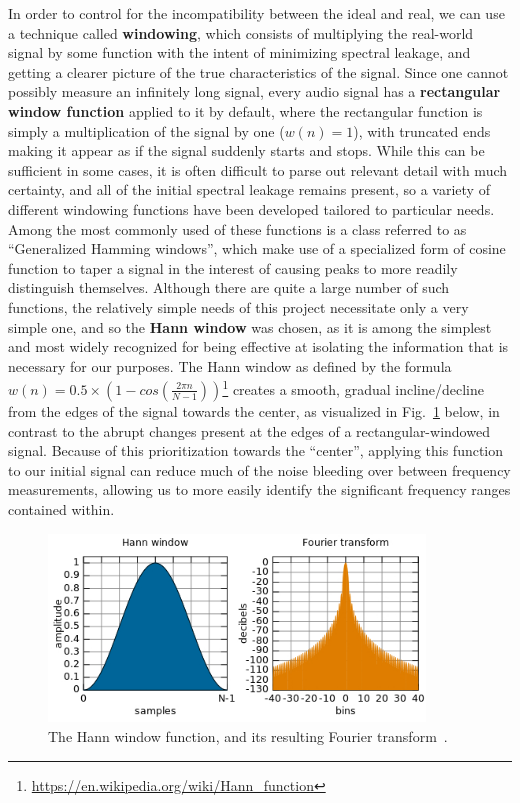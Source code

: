 \documentclass[12pt]{report}
\begin{document}
\indent In order to control for the incompatibility between the ideal and real, we can use a technique called {\bf windowing}, which consists of multiplying the real-world signal by some function with the intent of minimizing spectral leakage, and getting a clearer picture of the true characteristics of the signal. Since one cannot possibly measure an infinitely long signal, every audio signal has a {\bf rectangular window function} applied to it by default, where the rectangular function is simply a multiplication of the signal by one ($w(n) = 1$), with truncated ends making it appear as if the signal suddenly starts and stops. While this can be sufficient in some cases, it is often difficult to parse out relevant detail with much certainty, and all of the initial spectral leakage remains present, so a variety of different windowing functions have been developed tailored to particular needs. Among the most commonly used of these functions is a class referred to as ``Generalized Hamming windows'', which make use of a specialized form of cosine function to taper a signal in the interest of causing peaks to more readily distinguish themselves. Although there are quite a large number of such functions, the relatively simple needs of this project necessitate only a very simple one, and so the {\bf Hann window} was chosen, as it is among the simplest and most widely recognized for being effective at isolating the information that is necessary for our purposes. The Hann window as defined by the formula $w(n) = 0.5 \times (1 - cos(\frac{2 \pi n}{N - 1}))$\footnote{\url{https://en.wikipedia.org/wiki/Hann_function}} creates a smooth, gradual incline/decline from the edges of the signal towards the center, as visualized in Fig.~\ref{fig:hann} below, in contrast to the abrupt changes present at the edges of a rectangular-windowed signal. Because of this prioritization towards the ``center'', applying this function to our initial signal can reduce much of the noise bleeding over between frequency measurements, allowing us to more easily identify the significant frequency ranges contained within.

\begin{figure}[h]
	\centering
	\includegraphics[width=100mm]{hann.jpg}
	\caption[Hann Window Function]{The Hann window function, and its resulting Fourier transform~\cite{Niemitalo2013}.} 
	\label{fig:hann} 
\end{figure}
\end{document}
